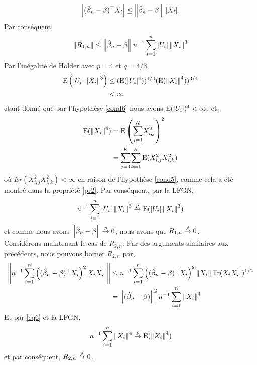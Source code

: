 \begin{align*}
\left\vert {(\hat{\beta}_n- \beta)^\top X_i} \right\vert \leq \left\Vert {\hat{\beta}_n- \beta} \right\Vert\left\Vert {X_i} \right\Vert
\end{align*}
Par conséquent,
\begin{align*}
\left\Vert {R_{1,n}} \right\Vert \leq \left\Vert {\hat{\beta}_n- \beta} \right\Vert n^{-1} \sum_{i=1}^n \left\vert {U_i} \right\vert\left\Vert {X_i} \right\Vert^3
\end{align*}
Par l'inégalité de Holder avec $p=4$ et $q=4/3$,
\begin{align*}
\operatorname{E}\left(\left\vert {U_i} \right\vert\left\Vert {X_i} \right\Vert^3\right)&\leq (\operatorname{E}(\left\vert {U_i} \right\vert^4))^{1/4}(\operatorname{E}(\left\Vert {X_i} \right\Vert^4))^{3/4}\\
&< \infty
\end{align*}
étant donné que par l'hypothèse \ref{cond6} nous avons $\operatorname{E}(\left\vert {U_i} \right\vert)^4<\infty$, et,
\begin{align}
\operatorname{E}(\left\Vert {X_i} \right\Vert^4) &= \operatorname{E}\left(\underset{j=1}{\overset{K}{\sum}}X_{i, j}^2\right)^2\nonumber\\
&= \underset{j=1}{\overset{K}{\sum}}\underset{k=1}{\overset{K}{\sum}}\operatorname{E}(X_{i, j}^2X_{i, k}^2)
\label{eq6}
\end{align}
où $Er(X_{i, j}^2X_{i, k}^2) < \infty$ en raison de l'hypothèse \ref{cond5}, comme cela a été montré dans la propriété \ref{pr2}. Par conséquent, par la LFGN,
\begin{align*}
n^{-1} \sum_{i=1}^n \left\vert {U_i} \right\vert\left\Vert {X_i} \right\Vert^3 \overset{p}{\rightarrow} \operatorname{E}(\left\vert {U_i} \right\vert\left\Vert {X_i} \right\Vert^3)
\end{align*}
et comme nous avons $\left\Vert {\hat{\beta}_n- \beta} \right\Vert \overset{p}{\rightarrow} 0$, nous avons que $R_{1,n} \overset{p}{\rightarrow} 0$.\\
Considérons maintenant le cas de $R_{2,n}$. Par des arguments similaires aux précédents, nous pouvons borner $R_{2,n}$ par,
\begin{align*}
\left\Vert {n^{-1} \sum_{i=1}^n\left((\hat{\beta}_n-\beta)^\top X_i\right)^2 X_iX_i^\top} \right\Vert &\leq
n^{-1}\sum_{i=1}^n  \left((\hat{\beta}_n-\beta)^\top X_i\right)^2 \left\Vert {X_i} \right\Vert\operatorname{Tr}(X_iX_i^\top)^{1/2}\\
&= \left\Vert {(\hat{\beta}_n-\beta)} \right\Vert^2n^{-1} \sum_{i=1}^n\left\Vert {X_i} \right\Vert^4
\end{align*}
Et par \eqref{eq6} et la LFGN,
\begin{align*}
n^{-1} \sum_{i=1}^n\left\Vert {X_i} \right\Vert^4 \overset{p}{\rightarrow} \operatorname{E}(\left\Vert {X_i} \right\Vert^4)
\end{align*}
et par conséquent, $R_{2,n} \overset{p}{\rightarrow} 0$.



 